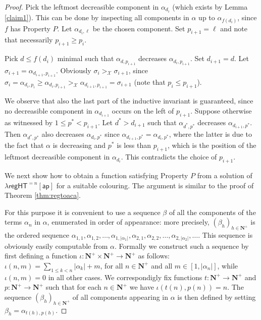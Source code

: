 \documentclass[10pt,a4paper]{amsart}
\newcommand\Nat{\mathbf{N}}
\newcommand\ap{\mathsf{ap}}
\newcommand\regHT{\mathsf{regHT}}
\begin{document}
\begin{proof}
Pick the leftmost decreasible component in $\alpha_{d_i}$ (which exists by Lemma \ref{claim1}). This can be done by inspecting all components in $\alpha$ up to 
$\alpha_{f(d_i)}$, since $f$ has Property $P$.  Let $\alpha_{d_i, \ell}$ be the chosen component. Set $p_{i+1}=\ell$ and note that necessarily $p_{i+1}\geq p_i$.


Pick $d \leq f(d_i)$ minimal such that $\alpha_{d, p_{i+1}}$
decreases $\alpha_{d_i, p_{i+1}}$. Set $d_{i+1}=d$. 
Let $\sigma_{i+1} = \alpha_{d_{i+1}, p_{i+1}}$. 
Obviously $\sigma_i >_\mathcal{X} \sigma_{i+1}$, since $\sigma_i  = \alpha_{d_i,p_i} \geq \alpha_{d_i,p_{i+1}} >_\mathcal{X} \alpha_{d_{i+1}, p_{i+1}} = \sigma_{i+1}$ (note that $p_i \leq p_{i+1}$).

We observe that also the last part of the inductive invariant is guaranteed, since no decreasible component 
in $\alpha_{d_{i+1}}$ occurs on the left of $p_{i+1}$. 
Suppose otherwise as witnessed by $1\leq p^* < p_{i+1}$. Let $d^* > d_{i+1}$ such that $\alpha_{d^*,p^*}$
decreases $\alpha_{d_{i+1}, p^*}$. Then $\alpha_{d^*, p^*}$ also decreases $\alpha_{d_i, p^*}$ 
since $\alpha_{d_{i+1}, p^*}= \alpha_{d_{i}, p^*}$, where the latter is due to the fact that $\alpha$ is decreasing 
and $p^*$ is less than $p_{i+1}$, which is the position of the leftmost decreasible component in $\alpha_{d_i}$. This contradicts the choice of $p_{i+1}$. 

\bigskip
We next show how to obtain a function satisfying Property $P$ from a solution of $\lambda\regHT^{=n}[\ap]$ for a suitable colouring. The argument is similar to the proof of Theorem \ref{thm:regtoaca}.

For this purpose it is convenient to use a sequence $\beta$ of all the components of the terms $\alpha_n$ in $\alpha$, enumerated in order of appearance: more precisely, $(\beta_h)_{h\in\Nat^+}$ is the ordered sequence $\alpha_{1,1}, \alpha_{1,2}, \dots, \alpha_{1,|\alpha_1|}, \alpha_{2,1}, \alpha_{2,2}, \dots, \alpha_{2,|\alpha_2|}, \dots$. 
This sequence is obviously easily computable from $\alpha$. 
Formally we construct such a sequence by first defining a function $\iota : \Nat^+\times\Nat^+\to \Nat^+$ as follows: $\iota(n,m)= \sum_{1\leq k < n} |\alpha_k| + m$, for all $n\in\Nat^+$ and all $m \in [1, |\alpha_n|]$, while 
$\iota(n,m)=0$ in all other cases. 
We correspondigly fix functions $t: \Nat^+ \to \Nat^+$ and $p:\Nat^+\to\Nat^+$ such that for each $n\in\Nat^+$ we have
$\iota(t(n),p(n))=n$. The sequence $(\beta_h)_{h\in\Nat^+}$ of all components appearing in $\alpha$ is then defined
by setting $\beta_h = \alpha_{t(h),p(h)}$. 



\end{proof}
\end{document}

